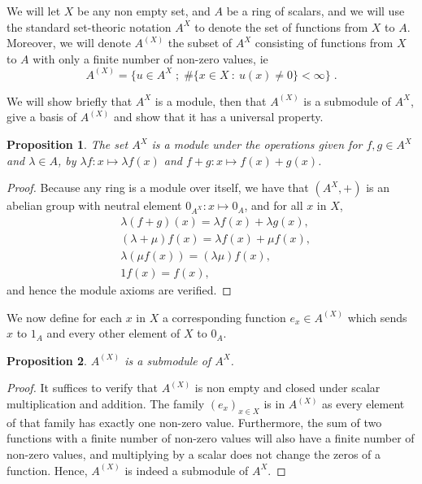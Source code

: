 \documentclass{report}
\newtheorem{prop}{Proposition}
\theoremstyle{definition}
\theoremstyle{remark}
\begin{document}
\bigskip
We will let $X$ be any non empty set, and $A$ be a ring of scalars, and we will use the standard set-theoric notation $A^X$ to denote the set of functions from $X$ to $A$. Moreover, we will denote $A^{(X)}$ the subset of $A^X$ consisting of functions from $X$ to $A$ with only a finite number of non-zero values, ie $$A^{(X)} = \{ u \in A^X \;;\; \#\{ x \in X\ :\ u(x) \neq 0\}< \infty \}\;.$$ 

We will show briefly that $A^X$ is a module, then that $A^{(X)}$ is a submodule of $A^X$, give a basis of $A^{(X)}$ and show that it has a universal property. 

\begin{prop}
    The set $A^X$ is a module under the operations given for $f,g \in A^X $ and $\lambda \in A$, by $\lambda f : x \mapsto \lambda f(x)$ and $ f + g : x \mapsto f(x) + g(x)$. 
\end{prop}

\begin{proof}
    Because any ring is a module over itself, we have that $(A^X,+)$ is an abelian group with neutral element $0_{A^X}:x \mapsto 0_A$, and for all $x$ in $X$, 
    \begin{equation*}
        \begin{split}
           & \lambda(f+g)(x) = \lambda f(x) + \lambda g(x), \\
           & (\lambda + \mu)f(x) = \lambda f(x) + \mu f(x), \\
           & \lambda(\mu f(x)) = (\lambda\mu) f(x), \\
           & 1 f(x) = f(x),
        \end{split}
    \end{equation*}
    and hence the module axioms are verified. 
\end{proof}

We now define for each $x$ in $X$ a corresponding function $e_x \in A^{(X)}$ which sends $x$ to $1_A$ and every other element of $X$ to $0_A$.

\begin{prop}
    $A^{(X)}$ is a submodule of $A^X$.
\end{prop}

\begin{proof}
    It suffices to verify that $A^{(X)}$ is non empty and closed under scalar multiplication and addition. The family $(e_x)_{x\in X}$ is in $A^{(X)}$ as every element of that family has exactly one non-zero value. Furthermore, the sum of two functions with a finite number of non-zero values will also have a finite number of non-zero values, and multiplying by a scalar does not change the zeros of a function. Hence, $A^{(X)}$ is indeed a submodule of $A^X$.
\end{proof}
\end{document}
